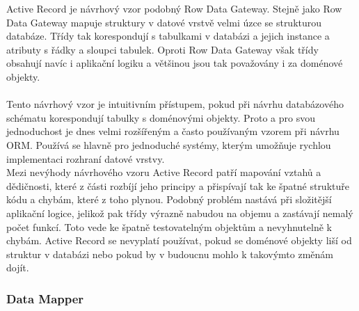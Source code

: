 \documentclass[ing,male,java,dept456]{diploma}						%
\begin{document}
Active Record je návrhový vzor podobný Row Data Gateway. Stejně jako Row Data Gateway mapuje struktury v datové vrstvě velmi úzce se strukturou databáze. Třídy tak korespondují s tabulkami v databázi a jejich instance a atributy s řádky a sloupci tabulek. Oproti Row Data Gateway však třídy obsahují navíc i aplikační logiku a většinou jsou tak považovány i za doménové objekty. \\
\cite[str. 160]{fowler} \\
Tento návrhový vzor je intuitivním přístupem, pokud při návrhu databázového schématu korespondují tabulky s doménovými objekty. Proto a pro svou jednoduchost je dnes velmi rozšířeným a často používaným vzorem při návrhu ORM. Používá se hlavně pro jednoduché systémy, kterým umožňuje rychlou implementaci rozhraní datové vrstvy. \\
Mezi nevýhody návrhového vzoru Active Record patří mapování vztahů a dědičnosti, které z části rozbíjí jeho principy a přispívají tak ke špatné struktuře kódu a chybám, které z toho plynou. Podobný problém nastává při složitější aplikační logice, jelikož pak třídy výrazně nabudou na objemu a zastávají nemalý počet funkcí. Toto vede ke špatně testovatelným objektům a nevyhnutelně k chybám. Active Record se nevyplatí používat, pokud se doménové objekty liší od struktur v databázi nebo pokud by v budoucnu mohlo k takovýmto změnám dojít.

\subsubsection{Data Mapper}
\end{document}
